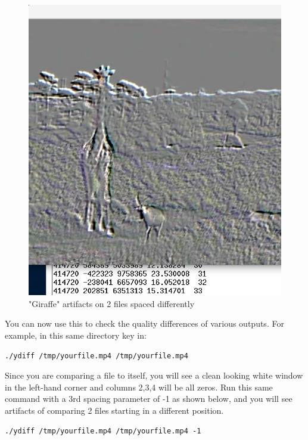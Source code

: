 \begin{figure}[h]
\begin{minipage}[t]{0.49\textwidth}
    \includegraphics[width=\linewidth]{ydiff_change.png}
    \caption{"Giraffe" artifacts on 2 files spaced differently}
  \end{minipage}
\end{figure}

You can now use this to check the quality differences of various
outputs. For example, in this same directory key in:
\begin{list}{}{}
\item \texttt{./ydiff /tmp/yourfile.mp4 /tmp/yourfile.mp4}
\end{list}

Since you are comparing a file to itself, you will see a clean looking white window in the left-hand corner and columns 2,3,4 will be all zeros. Run this same command with a 3rd spacing parameter of {}-1 as shown below, and you will see artifacts of comparing 2 files starting in a different position.
\begin{list}{}{}
\item \texttt{./ydiff /tmp/yourfile.mp4 /tmp/yourfile.mp4 -1}
\end{list}

